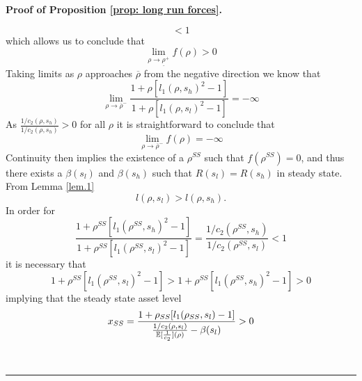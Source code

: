 \documentclass[thmsb,11pt]{article}
\newenvironment{proof}[1][Proof]{\noindent \textbf{#1.} }{\  \rule{0.5em}{0.5em}}
\begin{document}
{\begin{proof}[Proof of Proposition \ref{prop: long run forces}]
\begin{description}
\begin{equation*}
< 1
\end{equation*}
which allows us to conclude that
\begin{equation*}
\lim_{\rho\rightarrow\underline\rho^+} f(\rho) > 0
\end{equation*}
Taking limits as $\rho$ approaches $\overline\rho$ from the negative
direction we know that
\begin{equation*}
\lim_{\rho\rightarrow\overline\rho^-}\frac{1+\rho[l_1(\rho,s_h)^2-1]}{1+\rho[%
l_1(\rho,s_l)^2-1]} = -\infty
\end{equation*}
As $\frac{1/c_2(\rho,s_h)}{1/c_2(\rho,s_h)} > 0$ for all $\rho$ it is
straightforward to conclude that
\begin{equation*}
\lim_{\rho\rightarrow\overline\rho^-} f(\rho) = -\infty
\end{equation*}
Continuity then implies the existence of a $\rho^{SS}$ such that $%
f(\rho^{SS}) = 0$, and thus there exists a $\beta(s_l)$ and $\beta(s_h)$
such that $R(s_l) = R(s_h)$ in steady state. From Lemma \ref{lem.1}
\begin{equation*}
l(\rho,s_l) > l(\rho,s_h).
\end{equation*}
In order for
\begin{equation*}
\frac{1+\rho^{SS}[l_1(\rho^{SS},s_h)^2-1]}{1+\rho^{SS}[l_1(%
\rho^{SS},s_l)^2-1]} = \frac{1/c_2(\rho^{SS},s_h)}{1/c_2(\rho^{SS},s_l)} < 1
\end{equation*}
it is necessary that
\begin{equation*}
1+\rho^{SS}[l_1(\rho^{SS},s_l)^2-1] > 1+\rho^{SS}[l_1(\rho^{SS},s_h)^2-1] > 0
\end{equation*}
implying that the steady state asset level
\begin{equation*}
x_{SS} = \frac{1+\rho_{SS}[l_1(\rho_{SS},s_l)-1]}{\frac{1/c_2(\rho,s_l)}{%
\mathbb{E}[\frac1{c_2}](\rho)}-\beta(s_l)} >0
\end{equation*}


\end{description}
\end{proof}}
\end{document}
